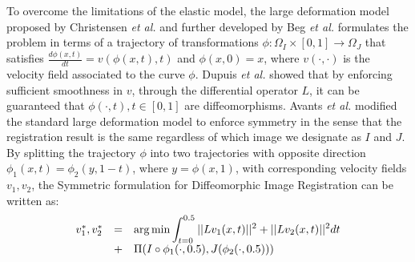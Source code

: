 To overcome the limitations of the elastic model, the large deformation model proposed by Christensen {\it et al.} \cite{Christensen2001} and further developed by Beg {\it et al.} \cite{Science2005} formulates the problem in terms of a trajectory of transformations \hbox{$\phi:\Omega_{I} \times [0, 1] \rightarrow \Omega_{J}$} that satisfies $\frac{d \phi(x, t)}{dt} = v(\phi(x, t), t)$ and $\phi(x, 0) = x$, where $v(\cdot, \cdot)$ is the velocity field associated to the curve $\phi$. Dupuis {\it et al.} \cite{Dupuis1998} showed that by enforcing sufficient smoothness in $v$, through the differential operator $L$, it can be guaranteed that $\phi(\cdot, t), t \in [0, 1]$ are diffeomorphisms. Avants {\it et al.} \cite{Avants2008, Avants2011} modified the standard large deformation model to enforce symmetry in the sense that the registration result is the same regardless of which image we designate as $I$ and $J$. By splitting the trajectory $\phi$ into two trajectories with opposite direction $\phi_{1}(x, t) = \phi_{2}(y, 1-t)$, where $y = \phi(x, 1)$, with corresponding velocity fields $v_{1}, v_{2}$, the Symmetric formulation for Diffeomorphic Image Registration \cite{Avants2008, Avants2011} can be written as:
\begin{equation}\label{eq:syn_energy}
    \begin{array}{lll}
        v_{1}^{*}, v_{2}^{*} &=& \mathlarger{\arg \min \int_{t=0}^{0.5} ||L v_{1}(x, t)||^{2} + ||L v_{2}(x, t)||^{2} dt}\\
        &+& \mathlarger{ \Pi(I \circ \phi_{1}(\cdot, 0.5), J(\phi_{2}(\cdot, 0.5)))}
    \end{array}
\end{equation}

